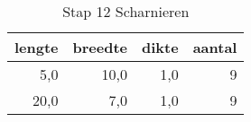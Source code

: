 \begin{table}[h!]
\centering
\caption{Stap 12 Scharnieren}
\begin{tabular}{rrrr}
\toprule
 lengte &  breedte &  dikte &  aantal \\
\midrule
    5,0 &     10,0 &    1,0 &       9 \\
   20,0 &      7,0 &    1,0 &       9 \\
\bottomrule
\end{tabular}
\end{table}
